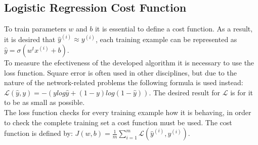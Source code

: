 \documentclass[11pt]{report}
\begin{document}
\subsection{Logistic Regression Cost Function}
To train parameters $w$ and $b$ it is essential to define a cost function. As a result, it is desired that $\hat{y}^{(i)} \approx y^{(i)}$, each training example can be represented as $\hat{y} = \sigma(w^tx^{(i)}+b)$.\\
To measure the efectiveness of the developed algorithm it is necessary to use the loss function. Square error is often used in other disciplines, but due to the nature of the network-related problems the following formula is used instead: $\mathcal{L}(\hat{y},y)= -(ylog\hat{y}+(1-y)log(1-\hat{y}))$. The desired result for $\mathcal{L}$ is for it to be as small as possible.\\
The loss function checks for every training example how it is behaving, in order to check the complete training set a cost function must be used. The cost function is defined by: $J(w,b)=\frac{1}{m}\sum_{i=1}^{m} \mathcal{L}(\hat{y}^{(i)},y^{(i)})$.
\end{document}
